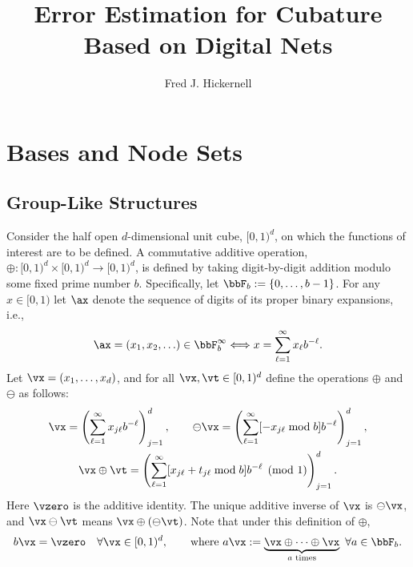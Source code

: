 \documentclass[]{elsarticle}
\theoremstyle{definition}
\newcommand{\cube}{[0,1)^d}
\begin{document}
\begin{frontmatter}

\title{Error Estimation for Cubature Based on Digital Nets}
\author{Fred J. Hickernell}
\address{Room E1-208, Department of Applied Mathematics, Illinois Institute of Technology,\\ 10 W.\ 32$^{\text{nd}}$ St., Chicago, IL 60616}
\begin{abstract} 
\end{abstract}

\begin{keyword}


\end{keyword}
\end{frontmatter}

\section{Bases and Node Sets}

\subsection{Group-Like Structures}
Consider the half open $d$-dimensional unit cube, $\cube$, on which the functions of interest are to be defined. A commutative additive operation, $\oplus:\cube \times \cube \to \cube$, is defined by taking digit-by-digit addition modulo some fixed prime number $b$.  Specifically, let $\bbF_b:=\{0, \ldots, b-1\}$.  For any $x \in [0,1)$ let $\ax$ denote the sequence of digits of its proper binary expansions, i.e., 
\begin{equation*}
\ax=(x_1, x_2, \ldots ) \in \bbF_b^\infty \Longleftrightarrow x=\sum_{\ell=1}^\infty x_{\ell} b^{-\ell}.
\end{equation*}
Let $\vx=(x_1, \ldots, x_d)$, and for all $\vx, \vt \in \cube$ define the operations $\oplus$ and $\ominus$ as follows:
\begin{gather*}
\vx = \left(\sum_{\ell=1}^{\infty} x_{j\ell} b^{-\ell}\right)_{j=1}^d, \qquad 
\ominus \vx = \left(\sum_{\ell=1}^{\infty} [-x_{j\ell} \bmod b] b^{-\ell}\right)_{j=1}^d,\\ 
\vx \oplus \vt = \left(\sum_{\ell=1}^{\infty} [x_{j\ell} + t_{j\ell} \bmod b] b^{-\ell} \pmod{1} \right)_{j=1}^d.
\end{gather*}
Here $\vzero$ is the additive identity.  The unique additive inverse of $\vx$ is $\ominus \vx$, and $\vx \ominus \vt$ means $\vx \oplus (\ominus \vt)$.  Note that under this definition of $\oplus$,
\[
b \vx = \vzero \quad \forall \vx \in \cube, \qquad \text{where } a \vx:=\underbrace{\vx \oplus \cdots \oplus \vx}_{a \text{ times}}\ \forall a \in \bbF_b.
\]
\end{document}
